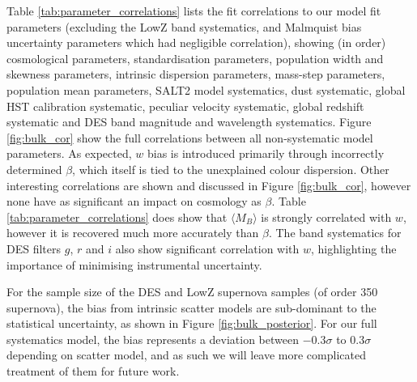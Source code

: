 \documentclass[a4paper,fleqn,usenatbib]{mnras}
\newcommand{\green}{\color{forestgreen}}
\begin{document}
Table \ref{tab:parameter_correlations} lists the fit correlations to our model fit parameters (excluding the LowZ band systematics, and Malmquist bias uncertainty parameters which had negligible correlation), showing (in order) cosmological parameters, standardisation parameters, population width and skewness parameters, intrinsic dispersion parameters, mass-step parameters, population mean parameters, SALT2 model systematics, dust systematic, global HST calibration systematic, peculiar velocity systematic, global redshift systematic and DES band magnitude and wavelength systematics. Figure \ref{fig:bulk_cor} show the full correlations between all non-systematic model parameters. As expected, $w$ bias is introduced primarily through incorrectly determined $\beta$, which itself is tied to the unexplained colour dispersion. Other interesting correlations are shown and discussed in Figure \ref{fig:bulk_cor}, however none have as significant an impact on cosmology as $\beta$. Table \ref{tab:parameter_correlations} does show that $\langle M_B \rangle$ is strongly correlated with $w$, however it is recovered much more accurately than $\beta$. The band systematics for DES filters $g$, $r$ and $i$ also show significant correlation with $w$, highlighting the importance of minimising instrumental uncertainty.


For the sample size of the DES and LowZ supernova samples (of order 350 supernova), the bias from intrinsic scatter models are sub-dominant to the statistical uncertainty, as shown in Figure \ref{fig:bulk_posterior}. {\green For our full systematics model, the bias represents a deviation between $-0.3\sigma$ to $0.3\sigma$ depending on scatter model, and as such we will leave more complicated treatment of them for future work.}
\end{document}
